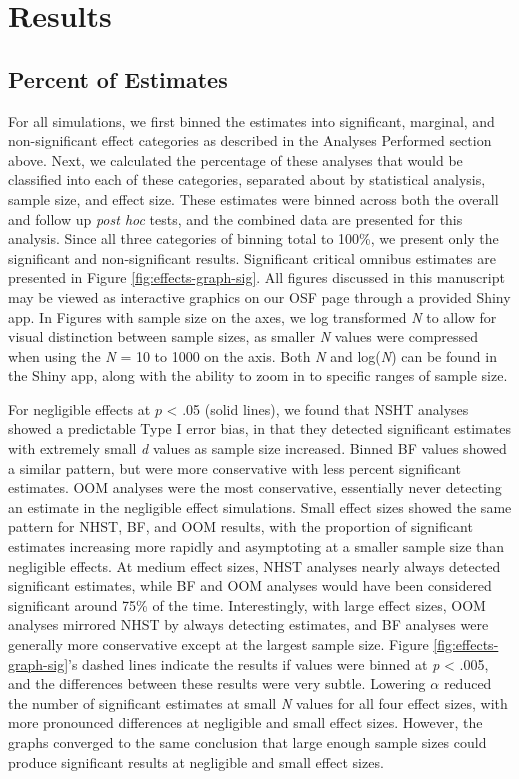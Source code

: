 \documentclass[english,mask,man]{apa6}
\theoremstyle{definition}
\theoremstyle{definition}
\theoremstyle{definition}
\theoremstyle{remark}
\begin{document}
\section{Results}\label{results}

\subsection{Percent of Estimates}\label{percent-of-estimates}

For all simulations, we first binned the estimates into significant,
marginal, and non-significant effect categories as described in the
Analyses Performed section above. Next, we calculated the percentage of
these analyses that would be classified into each of these categories,
separated about by statistical analysis, sample size, and effect size.
These estimates were binned across both the overall and follow up
\emph{post hoc} tests, and the combined data are presented for this
analysis. Since all three categories of binning total to 100\%, we
present only the significant and non-significant results. Significant
critical omnibus estimates are presented in Figure
\ref{fig:effects-graph-sig}. All figures discussed in this manuscript
may be viewed as interactive graphics on our OSF page through a provided
Shiny app. In Figures with sample size on the axes, we log transformed
\emph{N} to allow for visual distinction between sample sizes, as
smaller \emph{N} values were compressed when using the \emph{N} = 10 to
1000 on the axis. Both \emph{N} and log(\emph{N}) can be found in the
Shiny app, along with the ability to zoom in to specific ranges of
sample size.

For negligible effects at \(p\) \textless{} .05 (solid lines), we found
that NSHT analyses showed a predictable Type I error bias, in that they
detected significant estimates with extremely small \emph{d} values as
sample size increased. Binned BF values showed a similar pattern, but
were more conservative with less percent significant estimates. OOM
analyses were the most conservative, essentially never detecting an
estimate in the negligible effect simulations. Small effect sizes showed
the same pattern for NHST, BF, and OOM results, with the proportion of
significant estimates increasing more rapidly and asymptoting at a
smaller sample size than negligible effects. At medium effect sizes,
NHST analyses nearly always detected significant estimates, while BF and
OOM analyses would have been considered significant around 75\% of the
time. Interestingly, with large effect sizes, OOM analyses mirrored NHST
by always detecting estimates, and BF analyses were generally more
conservative except at the largest sample size. Figure
\ref{fig:effects-graph-sig}'s dashed lines indicate the results if
values were binned at \emph{p} \textless{} .005, and the differences
between these results were very subtle. Lowering \(\alpha\) reduced the
number of significant estimates at small \emph{N} values for all four
effect sizes, with more pronounced differences at negligible and small
effect sizes. However, the graphs converged to the same conclusion that
large enough sample sizes could produce significant results at
negligible and small effect sizes.
\end{document}
